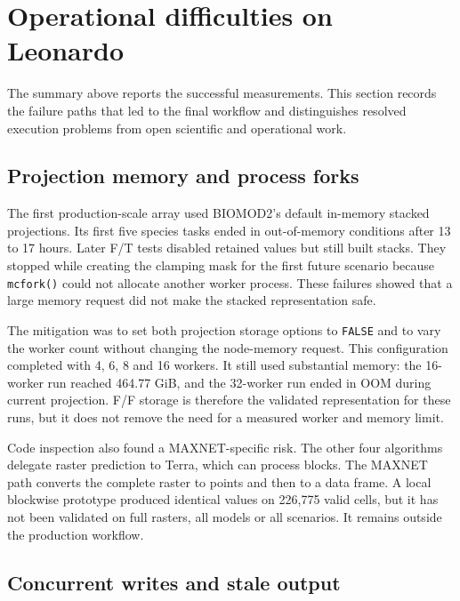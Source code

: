 

\section{Operational difficulties on Leonardo}

The summary above reports the successful measurements. This section records the failure paths that led to the final workflow and distinguishes resolved execution problems from open scientific and operational work.

\subsection{Projection memory and process forks}

The first production-scale array used BIOMOD2's default in-memory stacked projections. Its first five species tasks ended in out-of-memory conditions after 13 to 17 hours. Later F/T tests disabled retained values but still built stacks. They stopped while creating the clamping mask for the first future scenario because \texttt{mcfork()} could not allocate another worker process. These failures showed that a large memory request did not make the stacked representation safe.

The mitigation was to set both projection storage options to \texttt{FALSE} and to vary the worker count without changing the node-memory request. This configuration completed with 4, 6, 8 and 16 workers. It still used substantial memory: the 16-worker run reached 464.77 GiB, and the 32-worker run ended in OOM during current projection. F/F storage is therefore the validated representation for these runs, but it does not remove the need for a measured worker and memory limit.

Code inspection also found a MAXNET-specific risk. The other four algorithms delegate raster prediction to Terra, which can process blocks. The MAXNET path converts the complete raster to points and then to a data frame. A local blockwise prototype produced identical values on 226,775 valid cells, but it has not been validated on full rasters, all models or all scenarios. It remains outside the production workflow.

\subsection{Concurrent writes and stale output}

